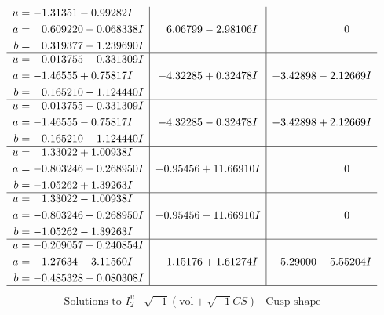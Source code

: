 \documentclass[1p]{elsarticle_modified}
\theoremstyle{definition}
\newcommand{\I}{\sqrt{-1}}
\begin{document}
$$\begin{array}{c|c|c}
\begin{aligned}
u &= -1.31351 - 0.99282 I \\
a &= \phantom{-}0.609220 - 0.068338 I \\
b &= \phantom{-}0.319377 - 1.239690 I\end{aligned}
 & \phantom{-}6.06799 - 2.98106 I & \phantom{-0.000000 } 0 \\ \hline\begin{aligned}
u &= \phantom{-}0.013755 + 0.331309 I \\
a &= -1.46555 + 0.75817 I \\
b &= \phantom{-}0.165210 - 1.124440 I\end{aligned}
 & -4.32285 + 0.32478 I & -3.42898 - 2.12669 I \\ \hline\begin{aligned}
u &= \phantom{-}0.013755 - 0.331309 I \\
a &= -1.46555 - 0.75817 I \\
b &= \phantom{-}0.165210 + 1.124440 I\end{aligned}
 & -4.32285 - 0.32478 I & -3.42898 + 2.12669 I \\ \hline\begin{aligned}
u &= \phantom{-}1.33022 + 1.00938 I \\
a &= -0.803246 - 0.268950 I \\
b &= -1.05262 + 1.39263 I\end{aligned}
 & -0.95456 + 11.66910 I & \phantom{-0.000000 } 0 \\ \hline\begin{aligned}
u &= \phantom{-}1.33022 - 1.00938 I \\
a &= -0.803246 + 0.268950 I \\
b &= -1.05262 - 1.39263 I\end{aligned}
 & -0.95456 - 11.66910 I & \phantom{-0.000000 } 0 \\ \hline\begin{aligned}
u &= -0.209057 + 0.240854 I \\
a &= \phantom{-}1.27634 - 3.11560 I \\
b &= -0.485328 - 0.080308 I\end{aligned}
 & \phantom{-}1.15176 + 1.61274 I & \phantom{-}5.29000 - 5.55204 I\\
 \hline 
 \end{array}$$\newpage$$\begin{array}{c|c|c}  
\text{Solutions to }I^u_{2}& \I (\text{vol} + \sqrt{-1}CS) & \text{Cusp shape}\\
 \hline 
\begin{aligned}

\end{aligned}
\end{array}$$
\end{document}
